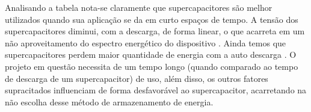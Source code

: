 Analisando a tabela nota-se claramente que supercapacitores são melhor utilizados quando sua aplicação se da em curto espaços de tempo. 
A tensão dos supercapacitores diminui, com a descarga, de forma linear, o que acarreta em um não aproveitamento do espectro energético do dispositivo \cite{supersantos}.
Ainda temos que supercapacitores perdem maior quantidade de energia com a auto descarga \cite{supersantos}.
O projeto em questão necessita de um tempo longo (quando comparado ao tempo de descarga de um supercapacitor) de uso, além disso, os outros fatores supracitados influenciam de forma desfavorável ao supercapacitor, acarretando na não escolha desse método de armazenamento de energia.
